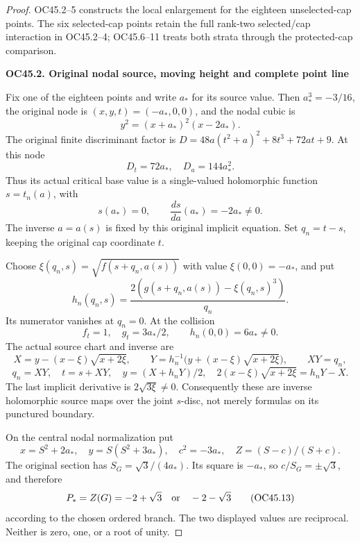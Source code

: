 \begin{proof}
OC45.2--5 constructs the local enlargement for the
eighteen unselected-cap points. The six selected-cap
points retain the full rank-two selected/cap interaction
in OC45.2--4; OC45.6--11 treats both strata through the
protected-cap comparison.

\par

\medskip\noindent\textbf{OC45.2. Original nodal source, moving height and complete point line}

\par\nobreak

Fix one of the eighteen points and write \(a_*\) for its source value.
Then \(a_*^3=-3/16\), the original node is
\((x,y,t)=(-a_*,0,0)\), and the nodal cubic is
\[
 y^2=(x+a_*)^2(x-2a_*).
 \tag{OC45.5}
\]
The original finite discriminant factor is
\(D=48a(t^2+a)^2+8t^3+72at+9\). At this node
\[
 D_t=72a_*,\quad D_a=144a_*^2.
 \tag{OC45.6}
\]
Thus its actual critical base value is a single-valued holomorphic
function \(s=t_n(a)\), with
\[
 s(a_*)=0,\qquad \frac{ds}{da}(a_*)=-2a_*\ne0.
 \tag{OC45.7}
\]
The inverse \(a=a(s)\) is fixed by this original implicit equation.
Set \(q_n=t-s\), keeping the original cap coordinate \(t\).

Choose \(\xi(q_n,s)=\sqrt{f(s+q_n,a(s))}\) with value
\(\xi(0,0)=-a_*\), and put
\[
 h_n(q_n,s)=
  \frac{2(g(s+q_n,a(s))-\xi(q_n,s)^3)}{q_n}.
 \tag{OC45.8}
\]
Its numerator vanishes at \(q_n=0\).
At the collision
\[
 f_t=1,\quad g_t=3a_*/2,\qquad h_n(0,0)=6a_*\ne0.
 \tag{OC45.9}
\]
The actual source chart and inverse are
\[
 X=y-(x-\xi)\sqrt{x+2\xi},\qquad
 Y=h_n^{-1}\bigl(y+(x-\xi)\sqrt{x+2\xi}\bigr),\qquad XY=q_n,
 \tag{OC45.10}
\]
\[
 q_n=XY,\quad t=s+XY,\quad y=(X+h_nY)/2,\quad
 2(x-\xi)\sqrt{x+2\xi}=h_nY-X.
 \tag{OC45.11}
\]
The last implicit derivative is \(2\sqrt{3\xi}\ne0\).
Consequently these are inverse holomorphic source maps over the
joint \(s\)-disc, not merely formulas on its punctured boundary.

On the central nodal normalization put
\[
 x=S^2+2a_*,\quad y=S(S^2+3a_*),\quad
 c^2=-3a_*,\quad Z=(S-c)/(S+c).
 \tag{OC45.12}
\]
The original section has \(S_G=\sqrt3/(4a_*)\).
Its square is \(-a_*\), so \(c/S_G=\pm\sqrt3\), and therefore
\[
 P_*=Z(G)=-2+\sqrt3\quad\hbox{or}\quad -2-\sqrt3
 \tag{OC45.13}
\]
according to the chosen ordered branch.
The two displayed values are reciprocal. Neither is zero,
one, or a root of unity.


\end{proof}
